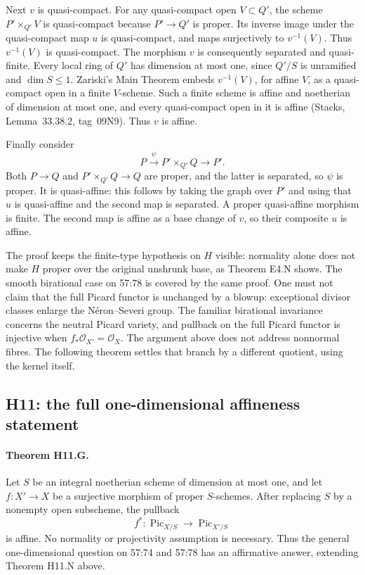 Next $v$ is quasi-compact. For any quasi-compact open $V\subset Q'$, the
scheme $P'\times_{Q'}V$ is quasi-compact because $P'\to Q'$ is proper.
Its inverse image under the quasi-compact map $u$ is quasi-compact, and maps
surjectively to $v^{-1}(V)$. Thus $v^{-1}(V)$ is quasi-compact. The morphism
$v$ is consequently separated and quasi-finite. Every local ring of $Q'$
has dimension at most one, since $Q'/S$ is unramified and $\dim S\le1$.
Zariski's Main Theorem embeds $v^{-1}(V)$, for affine $V$, as a quasi-compact
open in a finite $V$-scheme. Such a finite scheme is affine and noetherian
of dimension at most one, and every quasi-compact open in it is affine
(Stacks, Lemma~33.38.2, tag~09N9). Thus $v$ is affine.

Finally consider
\[
 P\xrightarrow{\psi} P'\times_{Q'}Q\longrightarrow P'.
\]
Both $P\to Q$ and $P'\times_{Q'}Q\to Q$ are proper, and the latter is
separated, so $\psi$ is proper. It is quasi-affine: this follows by taking
the graph over $P'$ and using that $u$ is quasi-affine and the second map
is separated. A proper quasi-affine morphism is finite. The second map
is affine as a base change of $v$, so their composite $u$ is affine.

The proof keeps the finite-type hypothesis on $H$ visible: normality alone
does not make $H$ proper over the original unshrunk base, as Theorem E4.N
shows. The smooth birational case on 57:78 is covered by the same proof.
One must not claim that the full Picard functor is unchanged by a blowup:
exceptional divisor classes enlarge the N\'eron--Severi group. The familiar
birational invariance concerns the neutral Picard variety, and pullback on
the full Picard functor is injective when $f_*\mathcal O_{X'}=\mathcal O_X$.
The argument above does not address nonnormal fibres. The following theorem
settles that branch by a different quotient, using the kernel itself.

\subsection{H11: the full one-dimensional affineness statement}

\paragraph{Theorem H11.G.}
Let $S$ be an integral noetherian scheme of dimension at most one, and let
$f:X'\to X$ be a surjective morphism of proper $S$-schemes. After replacing
$S$ by a nonempty open subscheme, the pullback
\[
 f^*:\operatorname{Pic}_{X/S}\longrightarrow\operatorname{Pic}_{X'/S}
\]
is affine. No normality or projectivity assumption is necessary.
Thus the general one-dimensional question on 57:74 and 57:78 has an
 affirmative answer, extending Theorem H11.N above.

